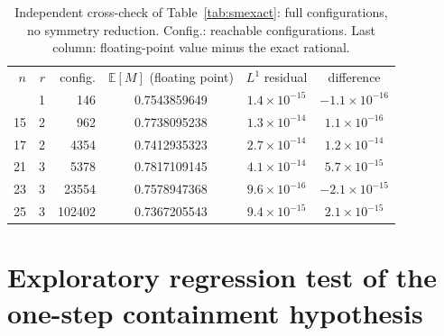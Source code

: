 \documentclass[aps,pre,onecolumn,superscriptaddress,amsmath,amssymb,longbibliography]{revtex4-2}
\theoremstyle{definition}
\theoremstyle{remark}
\newcommand{\E}{\mathbb{E}}
\begin{document}
\begin{table}[t]
\caption{Independent cross-check of Table~\ref{tab:smexact}: full
configurations, no symmetry reduction. Config.: reachable configurations.
Last column: floating-point value minus the exact rational.}
\label{tab:smcheck}
\begin{ruledtabular}
\begin{tabular}{rrrccc}
$n$ & $r$ & config. & $\E[M]$ (floating point) & $L^1$ residual & difference\\
\colrule
9 & 1 & 146 & 0.7543859649 & $1.4\times10^{-15}$ & $-1.1\times10^{-16}$\\
15 & 2 & 962 & 0.7738095238 & $1.3\times10^{-14}$ & $1.1\times10^{-16}$\\
17 & 2 & 4354 & 0.7412935323 & $2.7\times10^{-14}$ & $1.2\times10^{-14}$\\
21 & 3 & 5378 & 0.7817109145 & $4.1\times10^{-14}$ & $5.7\times10^{-15}$\\
23 & 3 & 23554 & 0.7578947368 & $9.6\times10^{-16}$ & $-2.1\times10^{-15}$\\
25 & 3 & 102402 & 0.7367205543 & $9.4\times10^{-15}$ & $2.1\times10^{-15}$\\
\end{tabular}
\end{ruledtabular}
\end{table}

\section{Exploratory regression test of the one-step containment hypothesis}
\label{sec:S7}
\end{document}
